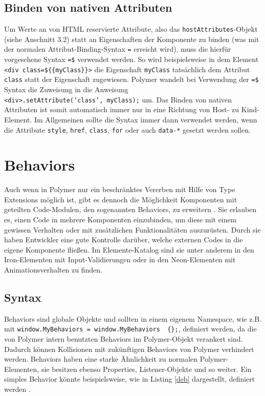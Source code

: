 \subsection{Binden von nativen Attributen}\label{binden-von-nativen-attributen}

Um Werte an von \ac{HTML} reservierte Attribute, also das \texttt{hostAttributes}-Objekt (siehe Anschnitt 3.2) statt an Eigenschaften der Komponente zu binden (was mit der normalen Attribut-Binding-Syntax \texttt{=} erreicht wird), muss die hierfür vorgesehene Syntax \texttt{=\$} verwendet werden. So wird beispielsweise in dem Element \texttt{\textless{}div\ class=\$\dq \{\{myClass\}\}\dq\textgreater{}} die Eigenschaft \texttt{myClass} tatsächlich dem Attribut \texttt{class} statt der Eigenschaft zugewiesen. Polymer wandelt bei Verwendung der \texttt{=\$} Syntax die Zuweisung in die Anweisung \texttt{\textless{}div\textgreater{}.setAttribute('class',\ myClass);} um. Das Binden von nativen Attributen ist somit automatisch immer nur in eine Richtung von Host- zu Kind-Element. Im Allgemeinen sollte die Syntax immer dann verwendet werden, wenn die Attribute \texttt{style}, \texttt{href}, \texttt{class}, \texttt{for} oder auch \texttt{data-*} gesetzt werden sollen.


\section{Behaviors}\label{behaviors}

Auch wenn in Polymer nur ein beschränktes Vererben mit Hilfe von Type Extensions möglich ist, gibt es dennoch die Möglichkeit Komponenten mit geteilten Code-Modulen, den sogenannten Behaviors, zu erweitern \cite{citeulike:13915080}. Sie erlauben es, einen Code in mehrere Komponenten einzubinden, um diese mit einem gewissen Verhalten oder mit zusätzlichen Funktionalitäten auszurüsten. Durch sie haben Entwickler eine gute Kontrolle darüber, welche externen Codes in die eigene Komponente fließen. Im Elemente-Katalog sind sie unter anderem in den Iron-Elementen mit Input-Validierungen oder in den Neon-Elementen mit Animationsverhalten zu finden.


\subsection{Syntax}\label{syntax}

Behaviors sind globale Objekte und sollten in einem eigenem Namespace, wie z.B. mit \texttt{window.MyBehaviors\ =\ window.MyBehaviors\ \textbar{}\textbar{}\ \{\};}, definiert werden, da die von Polymer intern benutzten Behaviors im
Polymer-Objekt verankert sind. Dadurch können Kollisionen mit zukünftigen Behaviors von Polymer verhindert werden. Behaviors haben eine starke Ähnlichkeit zu normalen Polymer-Elementen, sie besitzen ebenso Properties, Listener-Objekte und so weiter. Ein simples Behavior könnte beispielsweise, wie in Listing \ref{deb} dargestellt, definiert werden \cite{citeulike:13915079}.

